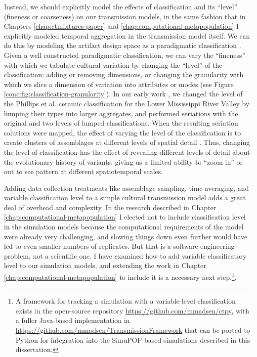 Instead, we should  explicitly model the effects of classification and its ``level'' (fineness or coarseness) on our transmission models, in the same fashion that in Chapters \ref{chap:ctmixtures-paper} and \ref{chap:computational-metapopulation} I explicitly modeled temporal aggregation in the transmission model itself.  We can do this by  modeling the artifact design space as a paradigmatic classification \citep{Dunnell1971,o2015design}.  Given a well constructed paradigmatic classification, we can vary the ``fineness'' with which we tabulate cultural variation by changing the ``level'' of the classification:  adding or removing dimensions, or changing the granularity with which we slice a dimension of variation into attributes or modes (see Figure \ref{conc:fig:classification-granularity}).  In our early work \citep{Lipo1997}, we changed the level of the Phillips et al. ceramic classification for the Lower Mississippi River Valley by lumping their types into larger aggregates, and performed seriations with the original and two levels of lumped classifications.  When the resulting seriation solutions were mapped, the effect of varying the level of the classification is to create clusters of assemblages at different levels of spatial detail \citep[Fig. 17]{Lipo1997}.  Thus, changing the level of classification has the effect of revealing different levels of detail about the evolutionary history of variants, giving us a limited ability to ``zoom in'' or out to see pattern at different spatiotemporal scales.

Adding data collection treatments like assemblage sampling, time averaging, and variable classification level to a simple cultural transmission model adds a great deal of overhead and complexity.  In the research described in Chapter \ref{chap:computational-metapopulation} I elected not to include classification level in the simulation models because the computational requirements of the model were already very challenging, and slowing things down even further would have led to even smaller numbers of replicates.  But that is a software engineering problem, not a scientific one.  I have examined how to add variable classificatory level to our simulation models, and extending the work in Chapter \ref{chap:computational-metapopulation} to include it is a necessary next step.\footnote{A framework for tracking a simulation with a variable-level classification exists in the open-source repository \url{https://github.com/mmadsen/ctpy}, with a fuller Java-based implementation in \url{https://github.com/mmadsen/TransmissionFramework} that can be ported to Python for integration into the SimuPOP-based simulations described in this dissertation.}.


